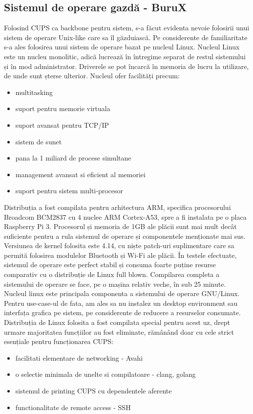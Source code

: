 \documentclass[12pt]{report}
\begin{document}
		\subsection{Sistemul de operare gazdă - BuruX}
Folosind CUPS ca backbone pentru sistem, s-a făcut evidenta nevoie folosirii unui sistem de operare Unix-like care sa îl găzduiască. Pe considerente de familiaritate s-a ales folosirea unui sistem de operare bazat pe nucleul Linux.
Nucleul Linux este un nucleu monolitic, adică lucrează în întregime separat de restul sistemului și în mod administrator. Driverele se pot încarcă în memoria de lucru la utilizare, de unde sunt șterse ulterior. Nucleul ofer facilități precum:
\begin{itemize}
\item multitasking
\item suport pentru memorie virtuala
\item suport avansat pentru TCP/IP
\item sistem de sunet
\item pana la 1 miliard de procese simultane
\item management avansat si eficient al memoriei
\item suport pentru sistem multi-procesor
\end{itemize}

Distribuția a fost compilata pentru arhitectura ARM, specifica procesorului Broadcom BCM2837 cu 4 nuclee ARM Cortex-A53, spre a fi instalata pe o placa Raspberry Pi 3. Procesorul și memoria de 1GB ale plăcii sunt mai mult decât suficiente pentru a rula sistemul de operare și componentele menționate mai sus. Versiunea de kernel folosita este 4.14, cu niște patch-uri suplimentare care sa permită folosirea modulelor Bluetooth și Wi-Fi ale plăcii. În testele efectuate, sistemul de operare este perfect stabil și consuma foarte puține resurse comparativ cu o distribuție de Linux full blown. Compilarea completa a sistemului de operare se face, pe o mașina relativ veche, în sub 25 minute. Nucleul linux este principala componenta a sistemului de operare GNU/Linux. Pentru use-case-ul de fata, am ales sa nu instalez un desktop environment sau interfața grafica pe sistem, pe considerente de reducere a resurselor consumate.
Distribuția de Linux folosita a fost compilata special pentru acest uz, drept urmare majoritatea funcțiilor au fost eliminate, rămânând doar cu cele strict esențiale pentru funcționarea CUPS:
\begin{itemize}
\item facilitati elementare de networking - Avahi
\item o selectie minimala de unelte si compilatoare - clang, golang
\item sistemul de printing CUPS cu dependentele aferente
\item functionalitate de remote access - SSH
\end{itemize}
\end{document}
